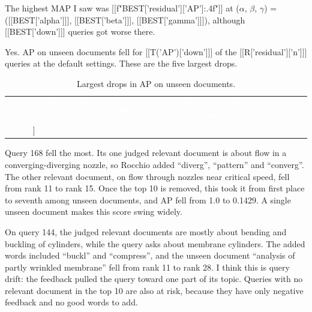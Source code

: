 The highest MAP I saw was [[f"{BEST['residual']['AP']:.4f}"]] at ($\alpha$, $\beta$, $\gamma$) = ([[BEST['alpha']]], [[BEST['beta']]], [[BEST['gamma']]]), although [[BEST['down']]] queries got worse there.

Yes. AP on unseen documents fell for [[T('AP')['down']]] of the [[R['residual']['n']]] queries at the default settings. These are the five largest drops.
\begin{table}[H]\small\centering\caption{Largest drops in AP on unseen documents.}
\begin{tabularx}{\linewidth}{rrrrY}\textcolor{white}{\textbf{Query}} & \textcolor{white}{\textbf{Relevant in top 10}} & \textcolor{white}{\textbf{Before}} & \textcolor{white}{\textbf{After}} & \textcolor{white}{\textbf{Heaviest added words (stemmed)}} \\
[[t_down()]]
\hline\end{tabularx}\end{table}
Query 168 fell the most. Its one judged relevant document is about flow in a converging-diverging nozzle, so Rocchio added ``diverg'', ``pattern'' and ``converg''. The other relevant document, on flow through nozzles near critical speed, fell from rank 11 to rank 15. Once the top 10 is removed, this took it from first place to seventh among unseen documents, and AP fell from 1.0 to 0.1429. A single unseen document makes this score swing widely.

On query 144, the judged relevant documents are mostly about bending and buckling of cylinders, while the query asks about membrane cylinders. The added words included ``buckl'' and ``compress'', and the unseen document ``analysis of partly wrinkled membrane'' fell from rank 11 to rank 28. I think this is query drift: the feedback pulled the query toward one part of its topic. Queries with no relevant document in the top 10 are also at risk, because they have only negative feedback and no good words to add.

